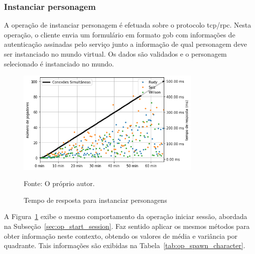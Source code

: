 \subsubsection{Instanciar personagem}

A operação de instanciar personagem é efetuada sobre o protocolo \ac{tcp}/\ac{rpc}.
%
Nesta operação, o cliente envia um formulário em formato \ac{gob} com informações de autenticação assinadas pelo serviço junto a informação de qual personagem deve ser instanciado no mundo virtual.
%
Os dados são validados e o personagem selecionado é instanciado no mundo.

\begin{figure}[htb!]
  \caption{Tempo de resposta para instanciar personagens}
  \label{fig:spawn_character_request_time}
  \includegraphics[width=0.8\textwidth]{figuras/analise/rt/spawn_character_request_time.png}
  \centering

  Fonte: O próprio autor.
\end{figure}

A Figura~\ref{fig:spawn_character_request_time} exibe o mesmo comportamento da operação iniciar sessão, abordada na Subseção~\ref{sec:op_start_session}.
%
Faz sentido aplicar os mesmos métodos para obter informação neste contexto, obtendo os valores de média e variância por quadrante.
%
Tais informações são exibidas na Tabela~\ref{tab:op_spawn_character}.

